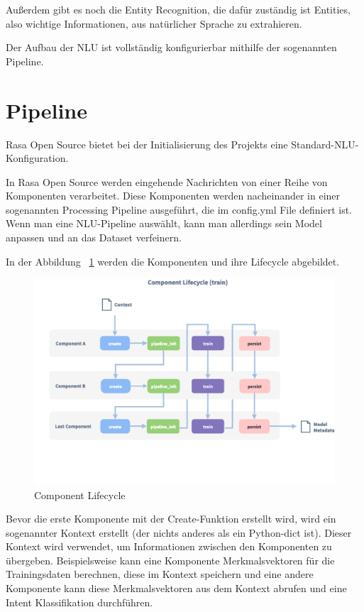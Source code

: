 Außerdem gibt es noch die Entity Recognition, die dafür zuständig ist Entities, also wichtige Informationen, aus natürlicher Sprache zu extrahieren.\cite{rasanlu}

Der Aufbau der NLU ist vollständig konfigurierbar mithilfe der sogenannten Pipeline.\cite{howToChooseAPipeline}


\section{Pipeline}
\label{sec:pipeline}

Rasa Open Source bietet bei der Initialisierung des Projekts eine Standard-NLU-Konfiguration.\cite{tuningYourModel}

In Rasa Open Source werden eingehende Nachrichten von einer Reihe von Komponenten verarbeitet.
Diese Komponenten werden nacheinander in einer sogenannten Processing Pipeline ausgeführt, die im config.yml File definiert ist.
Wenn man eine NLU-Pipeline auswählt, kann man allerdings sein Model anpassen und an das Dataset verfeinern.\cite{howToChooseAPipeline}

In der Abbildung ~\ref{fig:component_lifecycle} werden die Komponenten und ihre Lifecycle abgebildet.

\begin{figure}[hbt!]
    \centering
    \includegraphics[scale=0.25]{pics/component-lifecycle}
    \caption{Component Lifecycle~\cite{componentLifecycle}}
    \label{fig:component_lifecycle}
\end{figure}

Bevor die erste Komponente mit der Create-Funktion erstellt wird, wird ein sogenannter Kontext erstellt (der nichts anderes als ein Python-dict ist).
Dieser Kontext wird verwendet, um Informationen zwischen den Komponenten zu übergeben.
Beispielsweise kann eine Komponente Merkmalsvektoren für die Trainingsdaten berechnen, diese im Kontext speichern und eine andere Komponente kann diese Merkmalsvektoren aus dem Kontext abrufen und eine Intent Klassifikation durchführen.\cite{componentLifecycle, componentLifecycleDoc}

